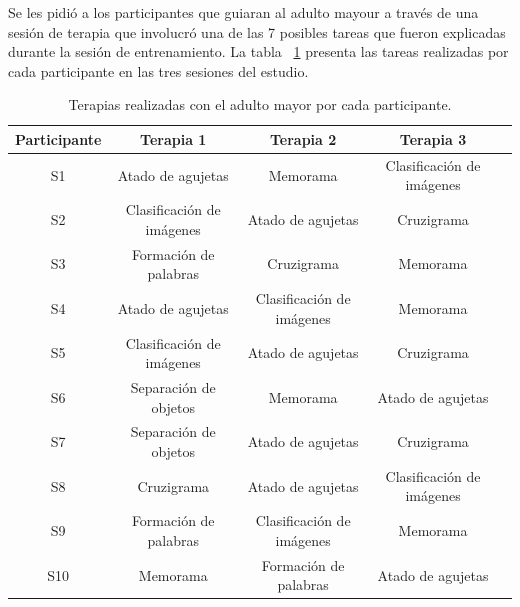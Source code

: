 Se les pidi\'o a los participantes que guiaran al adulto mayour a trav\'es de una sesi\'on de terapia que involucr\'o una de las 7 posibles tareas que fueron explicadas durante la sesi\'on de entrenamiento. La tabla ~\ref{table:therapies} presenta las tareas realizadas por cada participante en las tres sesiones del estudio.
\begin{table}[h]
\centering
\caption{Terapias realizadas con el adulto mayor por cada participante.}
\label{table:therapies}
\begin{tabular}{|c|c|c|c|c|}
\hline
 \textbf{Participante}&  \textbf{Terapia 1}& \textbf{Terapia 2}   & \textbf{Terapia 3}  \\ \hline
 S1&  Atado de agujetas& Memorama & Clasificaci\'on de im\'agenes   \\ \hline
 S2&  Clasificaci\'on de im\'agenes& Atado de agujetas & Cruzigrama   \\ \hline
 S3&  Formaci\'on de palabras& Cruzigrama & Memorama    \\ \hline
 S4&  Atado de agujetas& Clasificaci\'on de im\'agenes & Memorama   \\ \hline
 S5&  Clasificaci\'on de im\'agenes&  Atado de agujetas & Cruzigrama   \\ \hline
 S6&  Separaci\'on de objetos& Memorama & Atado de agujetas   \\ \hline
 S7&  Separaci\'on de objetos & Atado de agujetas & Cruzigrama   \\ \hline
 S8&  Cruzigrama& Atado de agujetas & Clasificaci\'on de im\'agenes   \\ \hline
 S9&  Formaci\'on de palabras& Clasificaci\'on de im\'agenes & Memorama   \\ \hline
 S10&  Memorama& Formaci\'on de palabras & Atado de agujetas   \\ \hline
\end{tabular}
\end{table}

